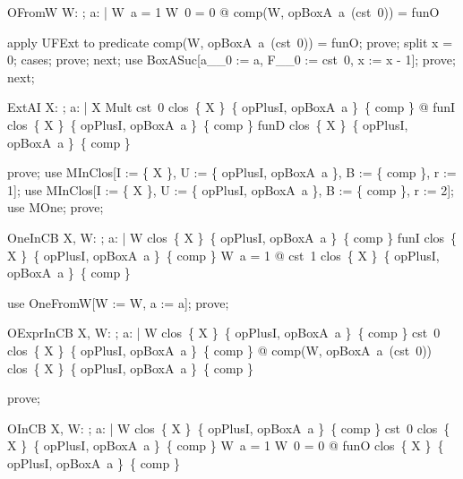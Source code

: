\documentclass{article}
\begin{document}
\begin{theorem}{OFromW}
  \forall W: \nat \fun \nat; a: \nat | W~a = 1 \land W~0 = 0 @ comp(W, opBoxA~a~(cst~0)) = funO
\end{theorem}

\begin{zproof}
apply UFExt to predicate comp(W, opBoxA~a~(cst~0)) = funO;
prove;
split x = 0;
cases;
prove;
next;
use BoxASuc[a\_\_0 := a, F\_\_0 := cst~0, x := x - 1];
prove;
next;
\end{zproof}

\begin{theorem}{ExtAI}
  \forall X: \nat \fun \nat; a: \nat | X \in Mult \land cst~0 \in clos~\{ X \}~\{ opPlusI, opBoxA~a \}~\{ comp \} @ funI \in clos~\{ X \}~\{ opPlusI, opBoxA~a \}~\{ comp \} \land funD \in clos~\{ X \}~\{ opPlusI, opBoxA~a \}~\{ comp \}
\end{theorem}

\begin{zproof}
prove;
use MInClos[I := \{ X \}, U := \{ opPlusI, opBoxA~a \}, B := \{ comp \}, r := 1];
use MInClos[I := \{ X \}, U := \{ opPlusI, opBoxA~a \}, B := \{ comp \}, r := 2];
use MOne;
prove;
\end{zproof}

\begin{theorem}{OneInCB}
  \forall X, W: \nat \fun \nat; a: \nat | W \in clos~\{ X \}~\{ opPlusI, opBoxA~a \}~\{ comp \} \land funI \in clos~\{ X \}~\{ opPlusI, opBoxA~a \}~\{ comp \} \land W~a = 1 @
    cst~1 \in clos~\{ X \}~\{ opPlusI, opBoxA~a \}~\{ comp \}
\end{theorem}

\begin{zproof}
use OneFromW[W := W, a := a];
prove;
\end{zproof}

\begin{theorem}{OExprInCB}
  \forall X, W: \nat \fun \nat; a: \nat | W \in clos~\{ X \}~\{ opPlusI, opBoxA~a \}~\{ comp \} \land cst~0 \in clos~\{ X \}~\{ opPlusI, opBoxA~a \}~\{ comp \} @
    comp(W, opBoxA~a~(cst~0)) \in clos~\{ X \}~\{ opPlusI, opBoxA~a \}~\{ comp \}
\end{theorem}

\begin{zproof}
prove;
\end{zproof}

\begin{theorem}{OInCB}
  \forall X, W: \nat \fun \nat; a: \nat | W \in clos~\{ X \}~\{ opPlusI, opBoxA~a \}~\{ comp \} \land cst~0 \in clos~\{ X \}~\{ opPlusI, opBoxA~a \}~\{ comp \} \land W~a = 1 \land W~0 = 0 @
    funO \in clos~\{ X \}~\{ opPlusI, opBoxA~a \}~\{ comp \}
\end{theorem}
\end{document}
